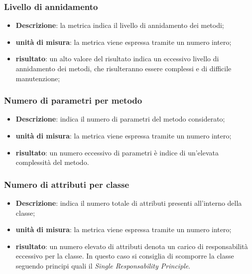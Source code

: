 	\subsubsection*{Livello di annidamento}
	\begin{itemize}
		\item{\textbf{Descrizione}}: la metrica indica il livello di annidamento dei metodi;
		\item{\textbf{unità di misura}}: la metrica viene espressa tramite un numero intero;
		\item{\textbf{risultato}}: un alto valore del risultato indica un eccessivo livello di annidamento dei metodi, che risulteranno essere complessi e di difficile manutenzione;
	\end{itemize}

	\subsubsection*{Numero di parametri per metodo}
	\begin{itemize}
		\item{\textbf{Descrizione}}: indica il numero di parametri del metodo considerato;
		\item{\textbf{unità di misura}}: la metrica viene espressa tramite un numero intero;
		\item{\textbf{risultato}}: un numero eccessivo di parametri è indice di un'elevata complessità del metodo.
	\end{itemize}

	\subsubsection*{Numero di attributi per classe}
	\begin{itemize}
		\item{\textbf{Descrizione}}: indica il numero totale di attributi presenti all'interno della classe;
		\item{\textbf{unità di misura}}: la metrica viene espressa tramite un numero intero;
		\item{\textbf{risultato}}: un numero elevato di attributi denota un carico di responsabilità eccessivo per la classe. In questo caso si consiglia di scomporre la classe seguendo principi quali il \textit{Single Responsability Principle}.
	\end{itemize}

